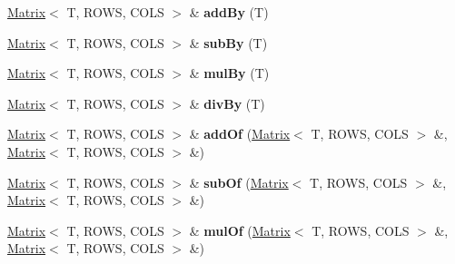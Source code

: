 \begin{DoxyCompactItemize}
\item 
\hypertarget{class_x_1_1_matrix_a4c4a84b225a3aef48dc2e290a801a42c}{\hyperlink{class_x_1_1_matrix}{Matrix}$<$ T, R\-O\-W\-S, C\-O\-L\-S $>$ \& {\bfseries add\-By} (T)}\label{class_x_1_1_matrix_a4c4a84b225a3aef48dc2e290a801a42c}

\item 
\hypertarget{class_x_1_1_matrix_a128686e35d3b3b56615472248d152f9a}{\hyperlink{class_x_1_1_matrix}{Matrix}$<$ T, R\-O\-W\-S, C\-O\-L\-S $>$ \& {\bfseries sub\-By} (T)}\label{class_x_1_1_matrix_a128686e35d3b3b56615472248d152f9a}

\item 
\hypertarget{class_x_1_1_matrix_a4a93e65e99ade587f47d604375336f81}{\hyperlink{class_x_1_1_matrix}{Matrix}$<$ T, R\-O\-W\-S, C\-O\-L\-S $>$ \& {\bfseries mul\-By} (T)}\label{class_x_1_1_matrix_a4a93e65e99ade587f47d604375336f81}

\item 
\hypertarget{class_x_1_1_matrix_a5f07640d5fc4c9ec5d8984e66e4b1b04}{\hyperlink{class_x_1_1_matrix}{Matrix}$<$ T, R\-O\-W\-S, C\-O\-L\-S $>$ \& {\bfseries div\-By} (T)}\label{class_x_1_1_matrix_a5f07640d5fc4c9ec5d8984e66e4b1b04}

\item 
\hypertarget{class_x_1_1_matrix_a3f53a8c894100f5a866cc3f5cfe905ee}{\hyperlink{class_x_1_1_matrix}{Matrix}$<$ T, R\-O\-W\-S, C\-O\-L\-S $>$ \& {\bfseries add\-Of} (\hyperlink{class_x_1_1_matrix}{Matrix}$<$ T, R\-O\-W\-S, C\-O\-L\-S $>$ \&, \hyperlink{class_x_1_1_matrix}{Matrix}$<$ T, R\-O\-W\-S, C\-O\-L\-S $>$ \&)}\label{class_x_1_1_matrix_a3f53a8c894100f5a866cc3f5cfe905ee}

\item 
\hypertarget{class_x_1_1_matrix_a3fd0ef2782f53565818707c98955a928}{\hyperlink{class_x_1_1_matrix}{Matrix}$<$ T, R\-O\-W\-S, C\-O\-L\-S $>$ \& {\bfseries sub\-Of} (\hyperlink{class_x_1_1_matrix}{Matrix}$<$ T, R\-O\-W\-S, C\-O\-L\-S $>$ \&, \hyperlink{class_x_1_1_matrix}{Matrix}$<$ T, R\-O\-W\-S, C\-O\-L\-S $>$ \&)}\label{class_x_1_1_matrix_a3fd0ef2782f53565818707c98955a928}

\item 
\hypertarget{class_x_1_1_matrix_a435b57c5d96ba16c44b60a3d23a9935f}{\hyperlink{class_x_1_1_matrix}{Matrix}$<$ T, R\-O\-W\-S, C\-O\-L\-S $>$ \& {\bfseries mul\-Of} (\hyperlink{class_x_1_1_matrix}{Matrix}$<$ T, R\-O\-W\-S, C\-O\-L\-S $>$ \&, \hyperlink{class_x_1_1_matrix}{Matrix}$<$ T, R\-O\-W\-S, C\-O\-L\-S $>$ \&)}\label{class_x_1_1_matrix_a435b57c5d96ba16c44b60a3d23a9935f}


\end{DoxyCompactItemize}
